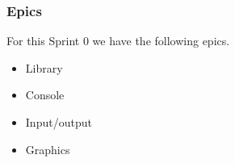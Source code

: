 \subsubsection{Epics}
For this Sprint 0 we have the following epics.
\begin{itemize}
    \item Library
    \item Console
    \item Input/output
    \item Graphics
\end{itemize}
